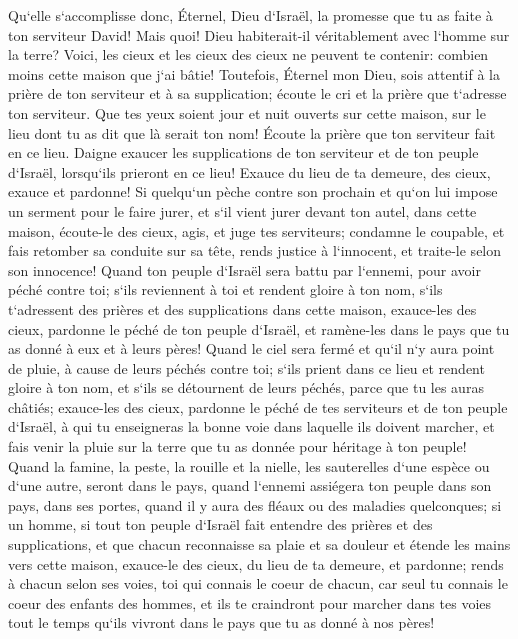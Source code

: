 \verse Qu`elle s`accomplisse donc, Éternel, Dieu d`Israël, la promesse que tu as faite à ton serviteur David! 
\verse Mais quoi! Dieu habiterait-il véritablement avec l`homme sur la terre? Voici, les cieux et les cieux des cieux ne peuvent te contenir: combien moins cette maison que j`ai bâtie! 
\verse Toutefois, Éternel mon Dieu, sois attentif à la prière de ton serviteur et à sa supplication; écoute le cri et la prière que t`adresse ton serviteur. 
\verse Que tes yeux soient jour et nuit ouverts sur cette maison, sur le lieu dont tu as dit que là serait ton nom! Écoute la prière que ton serviteur fait en ce lieu. 
\verse Daigne exaucer les supplications de ton serviteur et de ton peuple d`Israël, lorsqu`ils prieront en ce lieu! Exauce du lieu de ta demeure, des cieux, exauce et pardonne! 
\verse Si quelqu`un pèche contre son prochain et qu`on lui impose un serment pour le faire jurer, et s`il vient jurer devant ton autel, dans cette maison, 
\verse écoute-le des cieux, agis, et juge tes serviteurs; condamne le coupable, et fais retomber sa conduite sur sa tête, rends justice à l`innocent, et traite-le selon son innocence! 
\verse Quand ton peuple d`Israël sera battu par l`ennemi, pour avoir péché contre toi; s`ils reviennent à toi et rendent gloire à ton nom, s`ils t`adressent des prières et des supplications dans cette maison, 
\verse exauce-les des cieux, pardonne le péché de ton peuple d`Israël, et ramène-les dans le pays que tu as donné à eux et à leurs pères! 
\verse Quand le ciel sera fermé et qu`il n`y aura point de pluie, à cause de leurs péchés contre toi; s`ils prient dans ce lieu et rendent gloire à ton nom, et s`ils se détournent de leurs péchés, parce que tu les auras châtiés; 
\verse exauce-les des cieux, pardonne le péché de tes serviteurs et de ton peuple d`Israël, à qui tu enseigneras la bonne voie dans laquelle ils doivent marcher, et fais venir la pluie sur la terre que tu as donnée pour héritage à ton peuple! 
\verse Quand la famine, la peste, la rouille et la nielle, les sauterelles d`une espèce ou d`une autre, seront dans le pays, quand l`ennemi assiégera ton peuple dans son pays, dans ses portes, quand il y aura des fléaux ou des maladies quelconques; 
\verse si un homme, si tout ton peuple d`Israël fait entendre des prières et des supplications, et que chacun reconnaisse sa plaie et sa douleur et étende les mains vers cette maison, 
\verse exauce-le des cieux, du lieu de ta demeure, et pardonne; rends à chacun selon ses voies, toi qui connais le coeur de chacun, car seul tu connais le coeur des enfants des hommes, 
\verse et ils te craindront pour marcher dans tes voies tout le temps qu`ils vivront dans le pays que tu as donné à nos pères! 
